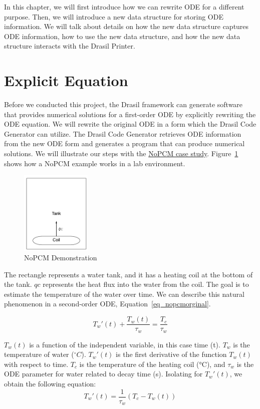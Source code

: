 In this chapter, we will first introduce how we can rewrite ODE for a different purpose. Then, we will introduce a new data structure for storing ODE information. We will talk about details on how the new data structure captures ODE information, how to use the new data structure, and how the new data structure interacts with the Drasil Printer.

\section{Explicit Equation}
Before we conducted this project, the Drasil framework can generate software that provides numerical solutions for a first-order ODE by explicitly rewriting the ODE equation. We will rewrite the original ODE in a form which the Drasil Code Generator can utilize. The Drasil Code Generator retrieves ODE information from the new ODE form and generates a program that can produce numerical solutions. We will illustrate our steps with the \href{https://jacquescarette.github.io/Drasil/examples/nopcm/SRS/srs/NoPCM_SRS.html#Sec:IMs}{NoPCM case study}. Figure~\ref{fig_nopcm} shows how a NoPCM example works in a lab environment.
\begin{figure}[ht]
\centering
\includegraphics[width=0.3\textwidth]{figures/NoPCM.png}
\caption{NoPCM Demonstration}
\label{fig_nopcm}
\end{figure}
The rectangle represents a water tank, and it has a heating coil at the bottom of the tank. $qc$ represents the heat flux into the water from the coil. The goal is to estimate the temperature of the water over time. We can describe this natural phenomenon in a second-order ODE, Equation~\ref{eq_nopcmorginal}.

\begin{equation} \label{eq_nopcmorginal}
	T_{w}'(t) +  \frac {T_{w}(t)}{\tau_{w}} = \frac{T_{c}}{\tau_{w}}
\end{equation}

$T_w(t)$ is a function of the independent variable, in this case time (t). $T_w$ is the temperature of water ($ ^\circ C $). $T_w'(t)$ is the first derivative of the function $T_w(t)$ with respect to time. $T_c$ is the temperature of the heating coil (°C), and $\tau_w$ is the ODE parameter for water related to decay time (s). Isolating for $T_w'(t)$, we obtain the following equation:
\begin{equation} \label{eq_nopcmderive}
	T_{w}'(t) = \frac{1}{\tau_{w}} (T_{c} - T_{w}(t))
\end{equation}


